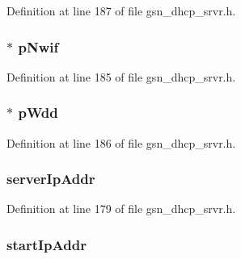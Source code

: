 Definition at line 187 of file gsn\_\-dhcp\_\-srvr.h.

\hypertarget{a00044_a98d510676ecd134a5e9ac61bf222cded}{
\subsubsection[{pNwif}]{$\ast$ {\bf pNwif}}}
\label{a00044_a98d510676ecd134a5e9ac61bf222cded}


Definition at line 185 of file gsn\_\-dhcp\_\-srvr.h.

\hypertarget{a00044_a97684b58b7a05f9b282a86a26929e1ba}{
\subsubsection[{pWdd}]{$\ast$ {\bf pWdd}}}
\label{a00044_a97684b58b7a05f9b282a86a26929e1ba}


Definition at line 186 of file gsn\_\-dhcp\_\-srvr.h.

\hypertarget{a00044_a09261ac30de0001f89753c8f3869ad2f}{
\subsubsection[{serverIpAddr}]{ {\bf serverIpAddr}}}
\label{a00044_a09261ac30de0001f89753c8f3869ad2f}


Definition at line 179 of file gsn\_\-dhcp\_\-srvr.h.

\hypertarget{a00044_abb7d94d80f2e2e351c9dc9be6e6a6372}{
\subsubsection[{startIpAddr}]{ {\bf startIpAddr}}}
\label{a00044_abb7d94d80f2e2e351c9dc9be6e6a6372}


